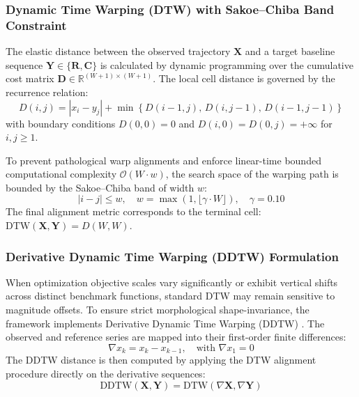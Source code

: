 \subsubsection{Dynamic Time Warping (DTW) with Sakoe--Chiba Band Constraint}

The elastic distance between the observed trajectory $\mathbf{X}$ and a target baseline sequence $\mathbf{Y} \in \{\mathbf{R}, \mathbf{C}\}$ is calculated by dynamic programming over the cumulative cost matrix $\mathbf{D} \in \mathbb{R}^{(W+1) \times (W+1)}$. The local cell distance is governed by the recurrence relation:
\begin{equation}
D(i, j) = |x_i - y_j| + \min \left\{ D(i-1, j),\, D(i, j-1),\, D(i-1, j-1) \right\}
\label{eq:dtw_recurrence}
\end{equation}
with boundary conditions $D(0, 0) = 0$ and $D(i, 0) = D(0, j) = +\infty$ for $i, j \ge 1$.

To prevent pathological warp alignments and enforce linear-time bounded computational complexity $\mathcal{O}(W \cdot w)$, the search space of the warping path is bounded by the Sakoe--Chiba band of width $w$:
\begin{equation}
|i - j| \le w, \quad w = \max(1, \lfloor \gamma \cdot W \rfloor), \quad \gamma = 0.10
\label{eq:sakoe_chiba}
\end{equation}
The final alignment metric corresponds to the terminal cell: $\text{DTW}(\mathbf{X}, \mathbf{Y}) = D(W, W)$.

\subsubsection{Derivative Dynamic Time Warping (DDTW) Formulation}

When optimization objective scales vary significantly or exhibit vertical shifts across distinct benchmark functions, standard DTW may remain sensitive to magnitude offsets. To ensure strict morphological shape-invariance, the framework implements Derivative Dynamic Time Warping (DDTW) \cite{keogh2001derivative}. The observed and reference series are mapped into their first-order finite differences:
\begin{equation}
\nabla x_k = x_k - x_{k-1}, \quad \text{with } \nabla x_1 = 0
\label{eq:derivative_transform}
\end{equation}
The DDTW distance is then computed by applying the DTW alignment procedure directly on the derivative sequences:
\begin{equation}
\text{DDTW}(\mathbf{X}, \mathbf{Y}) = \text{DTW}(\nabla \mathbf{X}, \nabla \mathbf{Y})
\label{eq:ddtw_metric}
\end{equation}

